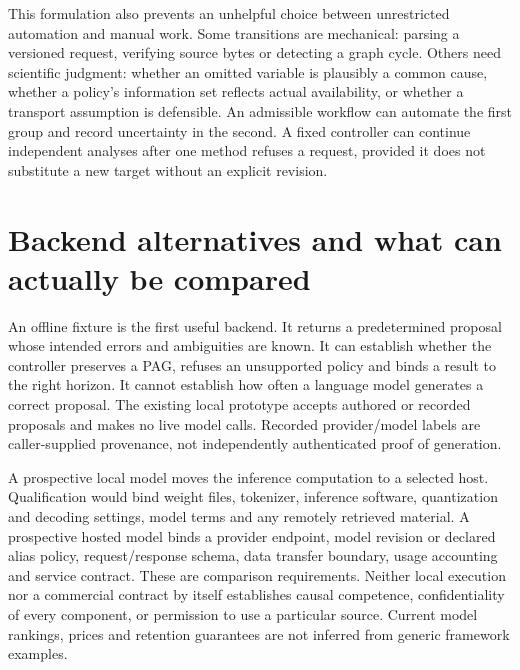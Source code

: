This formulation also prevents an unhelpful choice between unrestricted
automation and manual work. Some transitions are mechanical: parsing a
versioned request, verifying source bytes or detecting a graph cycle. Others
need scientific judgment: whether an omitted variable is plausibly a common
cause, whether a policy's information set reflects actual availability, or
whether a transport assumption is defensible. An admissible workflow can
automate the first group and record uncertainty in the second. A fixed
controller can continue independent analyses after one method refuses a
request, provided it does not substitute a new target without an explicit
revision.

\section{Backend alternatives and what can actually be compared}

An offline fixture is the first useful backend. It returns a predetermined
proposal whose intended errors and ambiguities are known. It can establish
whether the controller preserves a PAG, refuses an unsupported policy and
binds a result to the right horizon. It cannot establish how often a language
model generates a correct proposal. The existing local prototype accepts
authored or recorded proposals and makes no live model calls. Recorded
provider/model labels are caller-supplied provenance, not independently
authenticated proof of generation.\cite{exec13_architecture_local,exec14_l6_local}

A prospective local model moves the inference computation to a selected
host. Qualification would bind weight files, tokenizer, inference software,
quantization and decoding settings, model terms and any remotely retrieved
material. A prospective hosted model binds a provider endpoint, model
revision or declared alias policy, request/response schema, data transfer
boundary, usage accounting and service contract. These are comparison
requirements. Neither local execution nor a commercial contract by itself
establishes causal competence, confidentiality of every component, or
permission to use a particular source. Current model rankings, prices and
retention guarantees are not inferred from generic framework examples.
\cite{exec14_l6_design}

